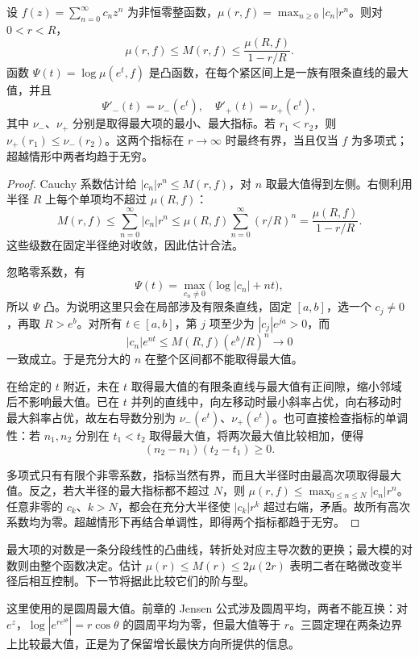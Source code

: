 \begin{proposition}[最大项与主导指标]\label{b3:prop:19-maximum-term}
设 \(f(z)=\sum_{n=0}^{\infty}c_nz^n\) 为非恒零整函数，\(\mu(r,f)=\max_{n\ge0}|c_n|r^n\)。则对 \(0<r<R\)，
\[
 \mu(r,f)\le M(r,f)\le\frac{\mu(R,f)}{1-r/R}.
\]
函数 \(\Psi(t)=\log\mu(e^t,f)\) 是凸函数，在每个紧区间上是一族有限条直线的最大值，并且
\[
 \Psi'_-(t)=\nu_-(e^t),\quad \Psi'_+(t)=\nu_+(e^t),
\]
其中 \(\nu_-\)、\(\nu_+\) 分别是取得最大项的最小、最大指标。若 \(r_1<r_2\)，则 \(\nu_+(r_1)\le\nu_-(r_2)\)。这两个指标在 \(r\to\infty\) 时最终有界，当且仅当 \(f\) 为多项式；超越情形中两者均趋于无穷。
\end{proposition}
\begin{proof}
Cauchy 系数估计给 \(|c_n|r^n\le M(r,f)\)，对 \(n\) 取最大值得到左侧。右侧利用半径 \(R\) 上每个单项均不超过 \(\mu(R,f)\)：
\[
 M(r,f)\le\sum_{n=0}^{\infty}|c_n|r^n
 \le\mu(R,f)\sum_{n=0}^{\infty}(r/R)^n
 =\frac{\mu(R,f)}{1-r/R}.
\]
这些级数在固定半径绝对收敛，因此估计合法。

忽略零系数，有
\[
 \Psi(t)=\max_{c_n\ne0}\bigl(\log|c_n|+nt\bigr),
\]
所以 \(\Psi\) 凸。为说明这里只会在局部涉及有限条直线，固定 \([a,b]\)，选一个 \(c_j\ne0\)，再取 \(R>e^b\)。对所有 \(t\in[a,b]\)，第 \(j\) 项至少为 \(|c_j|e^{ja}>0\)，而
\[
 |c_n|e^{nt}\le M(R,f)(e^b/R)^n\longrightarrow0
\]
一致成立。于是充分大的 \(n\) 在整个区间都不能取得最大值。

在给定的 \(t\) 附近，未在 \(t\) 取得最大值的有限条直线与最大值有正间隙，缩小邻域后不影响最大值。已在 \(t\) 并列的直线中，向左移动时最小斜率占优，向右移动时最大斜率占优，故左右导数分别为 \(\nu_-(e^t)\)、\(\nu_+(e^t)\)。也可直接检查指标的单调性：若 \(n_1,n_2\) 分别在 \(t_1<t_2\) 取得最大值，将两次最大值比较相加，便得
\[
 (n_2-n_1)(t_2-t_1)\ge0.
\]

多项式只有有限个非零系数，指标当然有界，而且大半径时由最高次项取得最大值。反之，若大半径的最大指标都不超过 \(N\)，则 \(\mu(r,f)\le\max_{0\le n\le N}|c_n|r^n\)。任意非零的 \(c_k\)、\(k>N\)，都会在充分大半径使 \(|c_k|r^k\) 超过右端，矛盾。故所有高次系数均为零。超越情形下再结合单调性，即得两个指标都趋于无穷。
\end{proof}
最大项的对数是一条分段线性的凸曲线，转折处对应主导次数的更换；最大模的对数则由整个函数决定。估计 \(\mu(r)\le M(r)\le2\mu(2r)\) 表明二者在略微改变半径后相互控制。下一节将据此比较它们的阶与型。

\ProseParagraphBreak

这里使用的是圆周最大值。前章的 Jensen 公式涉及圆周平均，两者不能互换：对 \(e^z\)，\(\log|e^{re^{\mathrm{i}\theta}}|=r\cos\theta\) 的圆周平均为零，但最大值等于 \(r\)。三圆定理在两条边界上比较最大值，正是为了保留增长最快方向所提供的信息。
